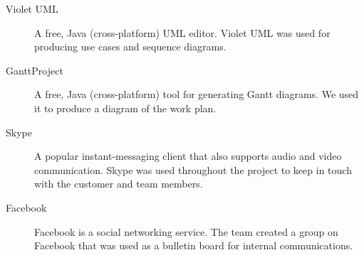 \begin{description}
\item[Violet UML]
A free, Java (cross-platform) UML editor. Violet UML was used for producing use cases and sequence diagrams.

\item[GanttProject]
A free, Java (cross-platform) tool for generating Gantt diagrams. We used it to produce a diagram of the work plan.

\item[Skype]
A popular instant-messaging client that also supports audio and video communication.
Skype was used throughout the project to keep in touch with the customer and team members.

\item[Facebook]
Facebook is a social networking service. The team created a group on Facebook that was used as a bulletin board for internal communications.


\end{description}


